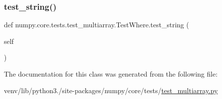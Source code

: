 \mbox{\label{classnumpy_1_1core_1_1tests_1_1test__multiarray_1_1TestWhere_a8d8ae6d9e3d0e7a37de675761d6f2e2e}} 
\subsubsection{\texorpdfstring{test\+\_\+string()}{test\_string()}}
{\footnotesize\ttfamily def numpy.\+core.\+tests.\+test\+\_\+multiarray.\+Test\+Where.\+test\+\_\+string (\begin{DoxyParamCaption}\item[{}]{self }\end{DoxyParamCaption})}



The documentation for this class was generated from the following file\+:\begin{DoxyCompactItemize}
\item 
venv/lib/python3./site-\/packages/numpy/core/tests/\hyperlink{core_2tests_2test__multiarray_8py}{test\+\_\+multiarray.\+py}\end{DoxyCompactItemize}
